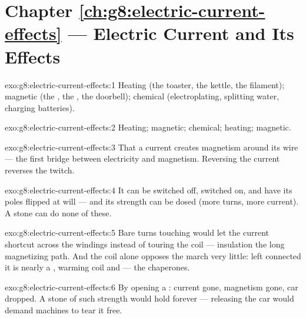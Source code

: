 \section*{Chapter \ref{ch:g8:electric-current-effects} --- Electric Current and Its Effects}

\begin{solution}{exo:g8:electric-current-effects:1}
Heating (the toaster, the kettle, the filament); magnetic (the
, the , the doorbell); chemical (electroplating,
splitting water, charging batteries).
\end{solution}

\begin{solution}{exo:g8:electric-current-effects:2}
Heating; magnetic; chemical; heating; magnetic.
\end{solution}

\begin{solution}{exo:g8:electric-current-effects:3}
That a current creates magnetism around its wire --- the first
bridge between electricity and magnetism. Reversing the current
reverses the twitch.
\end{solution}

\begin{solution}{exo:g8:electric-current-effects:4}
It can be switched off, switched on, and have its poles flipped
at will --- and its strength can be dosed (more turns, more
current). A stone  can do none of these.
\end{solution}

\begin{solution}{exo:g8:electric-current-effects:5}
Bare turns touching would let the current shortcut across the
windings instead of touring the coil --- insulation  the
long magnetizing path. And the coil alone opposes the march very
little: left connected it is nearly a , warming coil
and  --- the  chaperones.
\end{solution}

\begin{solution}{exo:g8:electric-current-effects:6}
By opening a : current gone, magnetism gone, car dropped. A
stone  of such strength would hold forever --- releasing
the car would demand machines to tear it free.
\end{solution}

